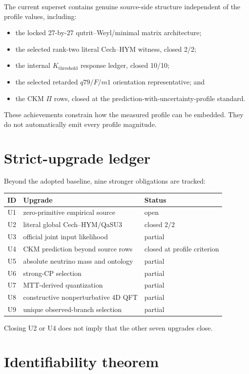 \documentclass[11pt]{article}
\begin{document}
The current superset contains genuine source-side structure independent of the
profile values, including:
\begin{itemize}
\item the locked 27-by-27 qutrit--Weyl/minimal matrix architecture;
\item the selected rank-two literal Cech--HYM witness, closed 2/2;
\item the internal $K_{\mathrm{threshold}}$ response ledger, closed 10/10;
\item the selected retarded $q79/F/m1$ orientation representative; and
\item the CKM $\Pi$ rows, closed at the prediction-with-uncertainty-profile
standard.
\end{itemize}
These achievements constrain how the measured profile can be embedded. They do
not automatically emit every profile magnitude.

\section{Strict-upgrade ledger}

Beyond the adopted baseline, nine stronger obligations are tracked:
\begin{center}
\begin{tabular}{cll}
\toprule
ID & Upgrade & Status \\
\midrule
U1 & zero-primitive empirical source & open \\
U2 & literal global Cech--HYM/QaSU3 & closed 2/2 \\
U3 & official joint input likelihood & partial \\
U4 & CKM prediction beyond source rows & closed at profile criterion \\
U5 & absolute neutrino mass and ontology & partial \\
U6 & strong-CP selection & partial \\
U7 & MTT-derived quantization & partial \\
U8 & constructive nonperturbative 4D QFT & partial \\
U9 & unique observed-branch selection & partial \\
\bottomrule
\end{tabular}
\end{center}
Closing U2 or U4 does not imply that the other seven upgrades close.

\section{Identifiability theorem}
\end{document}
